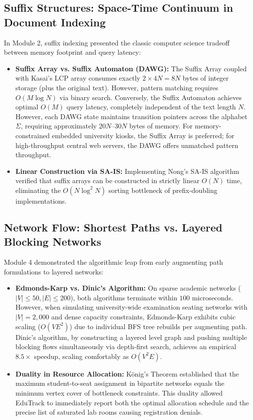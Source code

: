\subsection{Suffix Structures: Space-Time Continuum in Document Indexing}
In Module 2, suffix indexing presented the classic computer science tradeoff between memory footprint and query latency:
\begin{itemize}
    \item \textbf{Suffix Array vs. Suffix Automaton (DAWG):} The Suffix Array coupled with Kasai's LCP array consumes exactly $2 \times 4N = 8N$ bytes of integer storage (plus the original text). However, pattern matching requires $O(M \log N)$ via binary search. Conversely, the Suffix Automaton achieves optimal $O(M)$ query latency, completely independent of the text length $N$. However, each DAWG state maintains transition pointers across the alphabet $\Sigma$, requiring approximately $20N$--$30N$ bytes of memory. For memory-constrained embedded university kiosks, the Suffix Array is preferred; for high-throughput central web servers, the DAWG offers unmatched pattern throughput.
    \item \textbf{Linear Construction via SA-IS:} Implementing Nong's SA-IS algorithm verified that suffix arrays can be constructed in strictly linear $O(N)$ time, eliminating the $O(N \log^2 N)$ sorting bottleneck of prefix-doubling implementations.
\end{itemize}

\subsection{Network Flow: Shortest Paths vs. Layered Blocking Networks}
Module 4 demonstrated the algorithmic leap from early augmenting path formulations to layered networks:
\begin{itemize}
    \item \textbf{Edmonds-Karp vs. Dinic's Algorithm:} On sparse academic networks ($|V| \le 50, |E| \le 200$), both algorithms terminate within $100$ microseconds. However, when simulating university-wide examination seating networks with $|V| = 2,000$ and dense capacity constraints, Edmonds-Karp exhibits cubic scaling ($O(V E^2)$) due to individual BFS tree rebuilds per augmenting path. Dinic's algorithm, by constructing a layered level graph and pushing multiple blocking flows simultaneously via depth-first search, achieves an empirical $8.5\times$ speedup, scaling comfortably as $O(V^2 E)$.
    \item \textbf{Duality in Resource Allocation:} König's Theorem established that the maximum student-to-seat assignment in bipartite networks equals the minimum vertex cover of bottleneck constraints. This duality allowed EduTrack to immediately report both the optimal allocation schedule and the precise list of saturated lab rooms causing registration denials.
\end{itemize}

